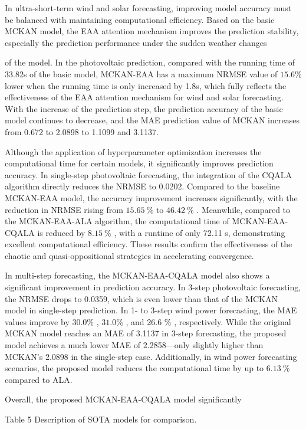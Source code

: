 \documentclass[
  10
]{article}
\begin{document}
In ultra-short-term wind and solar forecasting, improving model accuracy
must be balanced with maintaining computational efficiency. Based on the
basic MCKAN model, the EAA attention mechanism improves the prediction
stability, especially the prediction performance under the sudden
weather changes

of the model. In the photovoltaic prediction, compared with the running
time of 33.82s of the basic model, MCKAN-EAA has a maximum NRMSE value
of \(1 5 . 6 \%\) lower when the running time is only increased by 1.8s,
which fully reflects the effectiveness of the EAA attention mechanism
for wind and solar forecasting. With the increase of the prediction
step, the prediction accuracy of the basic model continues to decrease,
and the MAE prediction value of MCKAN increases from 0.672 to 2.0898 to
1.1099 and 3.1137.

Although the application of hyperparameter optimization increases the
computational time for certain models, it significantly improves
prediction accuracy. In single-step photovoltaic forecasting, the
integration of the CQALA algorithm directly reduces the NRMSE to 0.0202.
Compared to the baseline MCKAN-EAA model, the accuracy improvement
increases significantly, with the reduction in NRMSE rising from
\(1 5 . 6 5 ~ \%\) to \(4 6 . 4 2 ~ \%\) . Meanwhile, compared to the
MCKAN-EAA-ALA algorithm, the computational time of MCKAN-EAA-CQALA is
reduced by \(8 . 1 5 ~ \%\) , with a runtime of only 72.11 s,
demonstrating excellent computational efficiency. These results confirm
the effectiveness of the chaotic and quasi-oppositional strategies in
accelerating convergence.

In multi-step forecasting, the MCKAN-EAA-CQALA model also shows a
significant improvement in prediction accuracy. In 3-step photovoltaic
forecasting, the NRMSE drops to 0.0359, which is even lower than that of
the MCKAN model in single-step prediction. In 1- to 3-step wind power
forecasting, the MAE values improve by \(3 0 . 0 \%\) , \(3 1 . 0 \%\) ,
and 26.6 \(\%\) , respectively. While the original MCKAN model reaches
an MAE of 3.1137 in 3-step forecasting, the proposed model achieves a
much lower MAE of 2.2858---only slightly higher than MCKAN's 2.0898 in
the single-step case. Additionally, in wind power forecasting scenarios,
the proposed model reduces the computational time by up to
\(6 . 1 3 \ \%\) compared to ALA.

Overall, the proposed MCKAN-EAA-CQALA model significantly

Table 5 Description of SOTA models for comparison.
\end{document}

